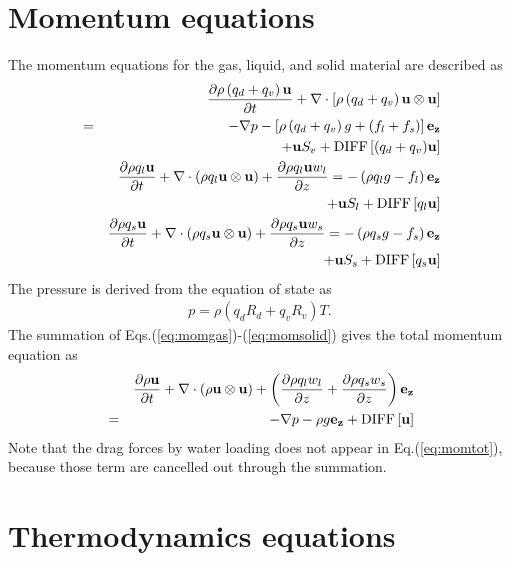\section{Momentum equations}

The momentum equations for the gas, liquid, and solid material 
are described as
\begin{eqnarray}
&&  \frac{\partial \rho \left(q_d+q_v\right) {\bf u}}{\partial t}
+ \nabla \cdot \left[\rho \left(q_d+q_v\right){\bf u} \otimes {\bf u}\right]\\
&=& 
-\nabla p - \left[\rho \left(q_d+q_v\right)g + (f_l+f_s)\right] {\bf e_z}\nonumber\\
&&+{\bf u} S_v +{\rm DIFF}\left[(q_d+q_v){\bf u}\right]
\label{eq:momgas}\\
&&  \frac{\partial \rho q_l {\bf u}}{\partial t}
+ \nabla \cdot \left(\rho q_l{\bf u} \otimes {\bf u}\right)  
+ \frac{\partial \rho q_l {\bf u} w_l}{\partial z}
= 
 - \left(\rho q_l g - f_l\right) {\bf e_z}\nonumber\\
&&+{\bf u} S_l+{\rm DIFF}\left[q_l{\bf u}\right]
\label{eq:momliquid}\\
&&  \frac{\partial \rho q_s {\bf u}}{\partial t}
+ \nabla \cdot \left(\rho q_s{\bf u} \otimes {\bf u}\right)  
+ \frac{\partial \rho q_s {\bf u }w_s}{\partial z}
= 
 - \left(\rho q_s g - f_s\right) {\bf e_z}\nonumber\\
&&+{\bf u} S_s+{\rm DIFF}\left[q_s{\bf u}\right]
\label{eq:momsolid}
\end{eqnarray}
The pressure is derived from the equation of state as
\begin{eqnarray}
p=\rho \left(q_d R_d + q_v R_v\right) T.\label{eq:state}
\end{eqnarray}
The summation of Eqs.(\ref{eq:momgas})-(\ref{eq:momsolid})
gives the total momentum equation as
\begin{eqnarray}
&&  \frac{\partial \rho {\bf u}}{\partial t}
+ \nabla \cdot \left(\rho{\bf u} \otimes {\bf u}\right)  
+ \left(\frac{\partial \rho q_l w_l}{\partial z}
+ \frac{\partial \rho q_s w_s}{\partial z}\right) {\bf e_z}\nonumber\\
&=&
-\nabla p - \rho g {\bf e_z} 
+{\rm DIFF}\left[{\bf u}\right]
\label{eq:momtot}
\end{eqnarray}
Note that the drag forces by water loading does not appear
in Eq.(\ref{eq:momtot}), 
because those term are cancelled out through the summation. 

\section{Thermodynamics equations}

